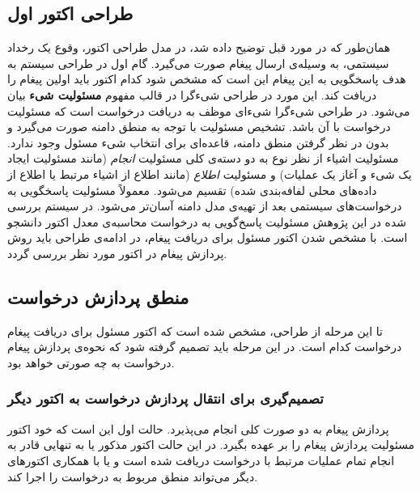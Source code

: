 \subsection{طراحی اکتور اول}
همان‌طور که در مورد قبل توضیح داده شد، در مدل طراحی اکتور، وقوع یک رخداد سیستمی، به وسیله‌ی ارسال پیغام صورت می‌گیرد. گام اول در طراحی سیستم به هدف پاسخگویی به این پیغام این است که مشخص شود کدام اکتور باید اولین پیغام را دریافت کند. این مورد در طراحی شیءگرا در قالب مفهوم \textbf{مسئولیت شیء} بیان می‌شود. در طراحی شیءگرا شیءای موظف به دریافت درخواست است که مسئولیت درخواست با آن باشد. تشخیص مسئولیت با توجه به منطق دامنه صورت می‌گیرد و بدون در نظر گرفتن منطق دامنه، قاعده‌ای برای انتخاب شیء مسئول وجود ندارد. مسئولیت اشیاء از نظر نوع به دو دسته‌ی کلی مسئولیت \textit{انجام} (مانند مسئولیت ایجاد یک شیء و آغاز یک عملیات) و مسئولیت \textit{اطلاع} (مانند اطلاع از اشیاء مرتبط یا اطلاع از داده‌های محلی لفافه‌بندی شده) تقسیم می‌شود\cite{Larman_2004,rdd}.
معمولاً  مسئولیت پاسخگویی به درخواست‌های سیستمی بعد از  تهیه‌ی مدل دامنه آسان‌تر می‌شود. در سیستم بررسی شده در این پژوهش مسئولیت پاسخ‌گویی به درخواست محاسبه‌ی 
معدل اکتور دانشجو است. با مشخص شدن اکتور مسئول برای دریافت پیغام، در ادامه‌ی طراحی باید روش پردازش پیغام در اکتور مورد نظر بررسی گردد.
\subsection{منطق پردازش درخواست}
تا این مرحله از طراحی، مشخص شده است که اکتور مسئول برای دریافت پیغام درخواست کدام است. در این مرحله باید تصمیم گرفته شود که نحوه‌ی پردازش پیغام درخواست به چه صورتی خواهد بود.
 \subsubsection{تصمیم‌گیری برای انتقال پردازش درخواست به اکتور دیگر}
 \label{design:delegate}
پردازش پیغام به دو صورت کلی انجام می‌پذیرد. حالت اول این است که خود اکتور مسئولیت پردازش پیغام را بر عهده بگیرد. در این حالت اکتور مذکور یا به تنهایی قادر به انجام تمام عملیات مرتبط با درخواست دریافت شده است و یا با همکاری اکتورهای دیگر می‌تواند منطق مربوط به درخواست را اجرا کند. 

